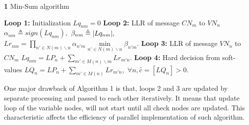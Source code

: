 \documentclass[10pt,a4paper]{article}
\DeclarePairedDelimiter\abs{\lvert}{\rvert}%
\begin{document}
\begin{algorithm}[H]
\renewcommand\thealgorithm{}
\caption{\textbf{1} Min-Sum algorithm}\label{algorithm1}
\begin{algorithmic}[1]
\STATE \textbf{Loop 1:} Initialization
\STATE
$Lq_{nm}=0$%
\ENDFOR
{}
\STATE \textbf{Loop 2:} LLR of message $CN_m$ to $VN_n$
\STATE $\alpha_{nm} \triangleq sign(Lq_{nm}),$
\STATE $\beta_{nm} \triangleq \abs{Lq_{nm}},$
\STATE $Lr_{mn} = \prod\limits_{n' \in N(m)\backslash n} \alpha_{n'm} \min\limits_{n' \in N(m)\backslash n} \beta_{n'm}.$
\ENDFOR
\STATE \textbf{Loop 3:} LLR of message $VN_n$ to $CN_m$
\STATE $Lq_{nm} = LP_n + \sum\limits_{m' \in M(n)\backslash m} Lr_{m'n}.$
\ENDFOR  
\ENDFOR %
\STATE \textbf{Loop 4:} Hard decision from soft-values
\STATE $LQ_{n} = LP_n + \sum\limits_{m' \in M(n)} Lr_{m'n},$
\STATE $\forall n, \hat{c}=[LQ_n]>0.$
\ENDFOR
\end{algorithmic}
\addtocounter{algorithm}{-1}
\end{algorithm}

One major drawback of Algorithm 1 is that, loops 2 and 3 are updated by separate processing and passed to each other iteratively. It means that update loop of the variable nodes, will not start until all check nodes are updated. This characteristic affects the efficiency of parallel implementation of such algorithm. 
\end{document}
